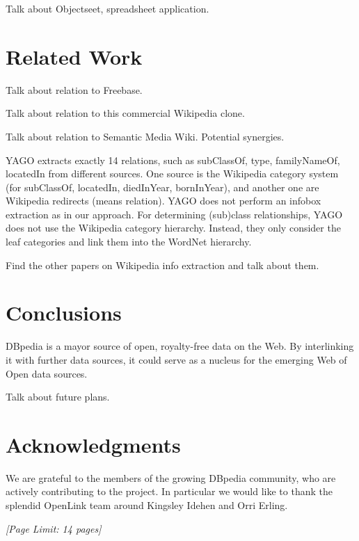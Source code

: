 \documentclass{llncs}
\begin{document}
Talk about Objectseet, spreadsheet application.

\section{Related Work}

Talk about relation to Freebase.

Talk about relation to this commercial Wikipedia clone.

Talk about relation to Semantic Media Wiki. Potential synergies.

YAGO \cite{suchanek2007WWW} extracts exactly 14 relations, such as subClassOf, type, familyNameOf, locatedIn from different sources. One source is the Wikipedia category system (for subClassOf, locatedIn, diedInYear, bornInYear), and another one are Wikipedia redirects (means relation). YAGO does not perform an infobox extraction as in our approach. For determining (sub)class relationships, YAGO does not use the Wikipedia category hierarchy. Instead, they only consider the leaf categories and link them into the WordNet hierarchy.

Find the other papers on Wikipedia info extraction and talk about them.

\section{Conclusions}

DBpedia is a mayor source of open, royalty-free data on the Web. By interlinking it with further data sources, it could serve as a nucleus for the emerging Web of Open data sources.

Talk about future plans.

\section*{Acknowledgments}
We are grateful to the members of the growing DBpedia community, who are actively contributing to the project. In particular we would like to thank the splendid OpenLink team around Kingsley Idehen and Orri Erling.




\emph{[Page Limit: 14 pages]}
\end{document}
